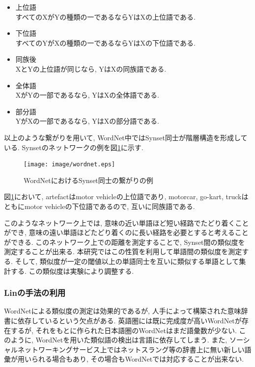 \documentclass[12pt]{jarticle}
\begin{document}
\begin{itemize}
\item 上位語 \\
すべてのXがYの種類の一であるならYはXの上位語である.
\item 下位語 \\
すべてのYがXの種類の一であるならYはXの下位語である.
\item 同族後 \\
XとYの上位語が同じなら, YはXの同族語である.
\item 全体語\\
XがYの一部であるなら, YはXの全体語である.
\item 部分語 \\
YがXの一部であるなら, YはXの部分語である.
\end{itemize}

以上のような繋がりを用いて, WordNet中ではSynset同士が階層構造を形成している.
Synsetのネットワークの例を図\ref{word_net}に示す.

\begin{figure}[htbp]
  \begin{center}
    \texttt{[image: image/wordnet.eps]}
  \end{center}
  \caption{WordNetにおけるSynset同士の繋がりの例}
  \label{word_net}
\end{figure}

図\ref{word_net}において, artefactはmotor vehicleの上位語であり, motorcar, go-kart, truckはともにmotor vehicleの下位語であるので, 互いに同族語である.

このようなネットワーク上では, 意味の近い単語ほど短い経路でたどり着くことができ, 意味の遠い単語ほどたどり着くのに長い経路を必要とすると考えることができる. このネットワーク上での距離を測定することで, Synset間の類似度を測定することが出来る\cite{wordnet-similarity}. 本研究ではこの性質を利用して単語間の類似度を測定する. そして, 類似度が一定の閾値以上の単語同士を互いに類似する単語として集計する. この類似度は実験により調整する.

\subsubsection{Linの手法の利用}
WordNetによる類似度の測定は効果的であるが, 人手によって構築された意味辞書に依存しているという欠点がある. 英語圏には既に完成度が高いWordNetが存在するが, それをもとに作られた日本語圏のWordNetはまだ語彙数が少ない. このように, WordNetを用いた類似語の検出は言語に依存してしまう. また, ソーシャルネットワーキングサービス上ではネットスラング等の辞書上に無い新しい語彙が用いられる場合もあり, その場合もWordNetでは対応することが出来ない.
\end{document}
